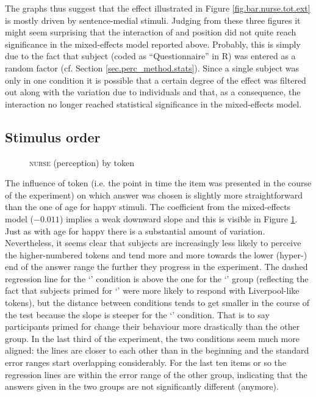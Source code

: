 The graphs thus suggest that the  effect illustrated in Figure \ref{fig.bar.nurse.tot.ext} is mostly driven by sentence-medial stimuli.
Judging from these three figures it might seem surprising that the interaction of  and position did not quite reach significance in the mixed-effects model reported above.
Probably, this is simply due to the fact that subject (coded as ``Questionnaire'' in R) was entered as a random factor (cf. Section \ref{sec.perc_method.stats}).
Since a single subject was only in one  condition it is possible that a certain degree of the  effect was filtered out along with the variation due to individuals and that, as a consequence, the interaction no longer reached statistical significance in the mixed-effects model.

\subsection{Stimulus order}
\label{sec.perc_res.nurse.order}

\begin{figure}[h]
	\centering
		\resizebox{.49\linewidth}{!}{} 
	\caption{\textsc{nurse} (perception) by token}
	\label{fig.scatter.nurse.ext.token}
\end{figure}

The influence of token (i.e. the point in time the item was presented in the course of the experiment) on which answer was chosen is slightly more straightforward than the one of age for happ\textsc{y} stimuli.
The coefficient from the mixed-effects model (\ensuremath{-0.011}) implies a weak downward slope and this is visible in Figure \ref{fig.scatter.nurse.ext.token}.
Just as with age for happ\textsc{y} there is a substantial amount of variation.
Nevertheless, it seems clear that subjects are increasingly less likely to perceive the higher-numbered tokens and tend more and more towards the lower (hyper-) end of the answer range the further they progress in the experiment.
The dashed regression line for the `'  condition is above the one for the `' group (reflecting the fact that subjects primed for `' were more likely to respond with Liverpool-like tokens), but the distance between conditions tends to get smaller in the course of the test because the slope is steeper for the `' condition. That is to say participants primed for  change their behaviour more drastically than the other group.
In the last third of the experiment, the two conditions seem much more aligned: the lines are closer to each other than in the beginning and the standard error ranges start overlapping considerably.
For the last ten items or so the regression lines are within the error range of the other group, indicating that the answers given in the two groups are not significantly different (anymore).

